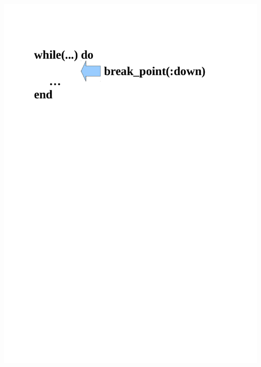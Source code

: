 \begin{frame}
	\begin{center}
	\ \\
		\includegraphics[scale=0.4]{scopes/beispiel4.pdf}
	\end{center}
\end{frame}

